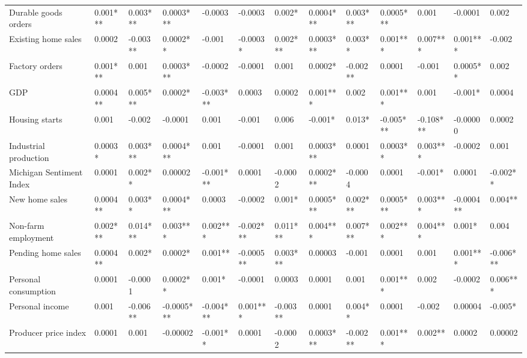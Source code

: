\begin{landscape}
\begin{table}[]
{\begin{tabular}{lllllllllllll}
Durable goods orders     & 0.001*** & 0.003*** & 0.0003***  & -0.0003   & -0.0003   & 0.002*   & 0.0004*** & 0.003***  & 0.0005*** & 0.001     & -0.0001   & 0.002     \\
Existing home sales      & 0.0002   & -0.003** & 0.0002**   & -0.001    & -0.0003*  & 0.002*** & 0.0003*** & 0.003**   & 0.001***  & 0.007***  & 0.001***  & -0.002    \\
Factory orders           & 0.001*** & 0.001    & 0.0003***  & -0.0002   & -0.0001   & 0.001    & 0.0002*   & -0.002**  & 0.0001    & -0.001    & 0.0005**  & 0.002     \\
GDP                      & 0.0004** & 0.005*** & 0.0002*    & -0.003*** & 0.0003    & 0.0002   & 0.001***  & 0.002     & 0.001***  & 0.001     & -0.001*   & 0.0004    \\
Housing starts           & 0.001    & -0.002   & -0.0001    & 0.001     & -0.001    & 0.006    & -0.001*   & 0.013*    & -0.005*** & -0.108*** & -0.00000  & 0.0002    \\
Industrial production    & 0.0003*  & 0.003*** & 0.0004***  & 0.001     & -0.0001   & 0.001    & 0.0003*** & 0.0001    & 0.0003**  & 0.003***  & -0.0002   & 0.001     \\
Michigan Sentiment Index & 0.0001   & 0.002**  & 0.00002    & -0.001*** & 0.0001    & -0.0002  & 0.0002*** & -0.0004   & 0.0001    & -0.001*   & 0.0001    & -0.002**  \\
New home sales           & 0.0004** & 0.003**  & 0.0004***  & 0.0003    & -0.0002   & 0.001*   & 0.0005*** & 0.002***  & 0.0005*** & 0.003***  & -0.0004** & 0.004**   \\
Non-farm employment      & 0.002*** & 0.014*** & 0.003***   & 0.002***  & -0.002*** & 0.011*** & 0.004***  & 0.007***  & 0.002***  & 0.004***  & 0.001*    & 0.004     \\
Pending home sales       & 0.0004** & 0.002*   & 0.0002*    & 0.001**   & -0.0005** & 0.003*** & 0.00003   & -0.001    & 0.0001    & 0.001     & 0.001***  & -0.006*** \\
Personal consumption     & 0.0001   & -0.0001  & 0.0002**   & 0.001*    & -0.0001   & 0.0003   & 0.0001    & 0.001     & 0.001***  & 0.002     & -0.0002   & 0.006***  \\
Personal income          & 0.001    & -0.006** & -0.0005*** & -0.004*** & 0.001***  & -0.003** & 0.0001    & 0.004**   & 0.0001    & -0.002    & 0.00004   & -0.005*   \\
Producer price index     & 0.0001   & 0.001    & -0.00002   & -0.001**  & 0.0001    & -0.0002  & 0.0003*** & -0.002**  & 0.001***  & 0.002**   & 0.0002    & 0.00002   \\

\end{tabular}}
\end{table}
\end{landscape}
